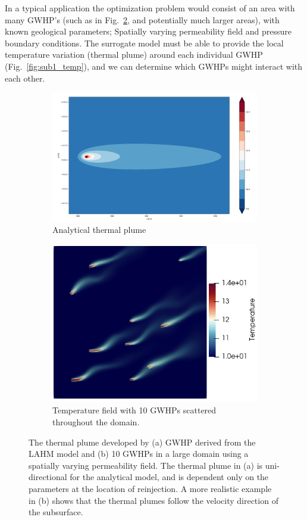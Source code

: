 \documentclass{article} %
\begin{document}
In a typical application the optimization problem would consist of an area with many GWHP's (such as in Fig.~\ref{large_example}, and potentially much larger areas), with known geological parameters; Spatially varying permeability field and pressure boundary conditions. 
The surrogate model must be able to provide the local temperature variation (thermal plume) around each individual GWHP (Fig.~\ref{fig:sub1_temp}), and we can determine which GWHPs might interact with each other.

\begin{figure}[!htb]
\centering
\begin{subfigure}{.5\textwidth}
  \centering
  \includegraphics[width=.8\linewidth]{analyticalPlume.png}
  \caption{Analytical thermal plume}
  \label{analyticalPlume}
\end{subfigure}%
\begin{subfigure}{.5\textwidth}
  \centering
  \includegraphics[width=.8\linewidth]{large_temp_example_2.png}
  \caption{Temperature field with 10 GWHPs scattered throughout the domain.}
  \label{large_example}
\end{subfigure}
\caption{The thermal plume developed by (a) GWHP derived from the LAHM model \citep{Pophillat2020} and (b) 10 GWHPs in a large domain using a spatially varying permeability field. The thermal plume in (a) is uni-directional for the analytical model, and is dependent only on the parameters at the location of reinjection. A more realistic example in (b) shows that the thermal plumes follow the velocity direction of the subsurface.}
\label{fig:plume_and_overview}
\end{figure}
\end{document}
